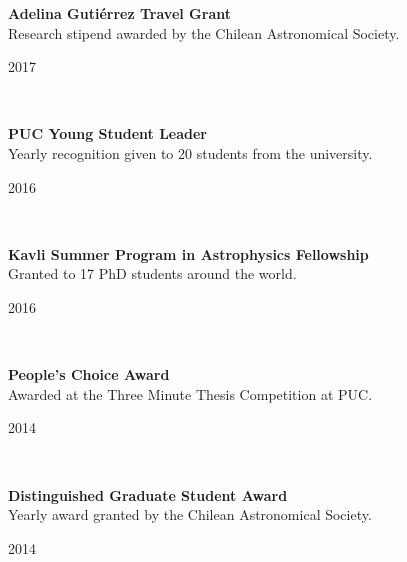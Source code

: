\documentclass[11pt, a4paper]{article} %
\begin{document}
\begin{minipage}[t]{0.7\textwidth}
\begin{flushleft}%
  \setlength{\leftskip}{0.2cm}%
\textbf{Adelina Guti\'errez Travel Grant}\\
Research stipend awarded by the Chilean Astronomical Society.
\end{flushleft}
\end{minipage}
\begin{minipage}[t]{0.3\textwidth}
\hfill 2017
\end{minipage}\\

\begin{minipage}[t]{0.7\textwidth}
\begin{flushleft}%
  \setlength{\leftskip}{0.2cm}%
\textbf{PUC Young Student Leader}\\
Yearly recognition given to 20 students from the university.
\end{flushleft}
\end{minipage}
\begin{minipage}[t]{0.3\textwidth}
\hfill 2016
\end{minipage}\\

\begin{minipage}[t]{0.7\textwidth}
\begin{flushleft}%
  \setlength{\leftskip}{0.2cm}%
\textbf{Kavli Summer Program in Astrophysics Fellowship}\\
Granted to 17 PhD students around the world.
\end{flushleft}
\end{minipage}
\begin{minipage}[t]{0.3\textwidth}
\hfill 2016
\end{minipage}\\

\begin{minipage}[t]{0.7\textwidth}
\begin{flushleft}%
  \setlength{\leftskip}{0.2cm}%
\textbf{People's Choice Award}\\
 Awarded at the Three Minute Thesis\textsuperscript{\textregistered} Competition at PUC.
 \end{flushleft}
\end{minipage}
\begin{minipage}[t]{0.3\textwidth}
\hfill 2014
\end{minipage}\\

\begin{minipage}[t]{0.7\textwidth}
\begin{flushleft}%
  \setlength{\leftskip}{0.2cm}%
\textbf{Distinguished Graduate Student Award}\\
 Yearly award granted by the Chilean Astronomical Society.
 \end{flushleft}
\end{minipage}
\begin{minipage}[t]{0.3\textwidth}
\hfill 2014
\end{minipage}\\
\end{document}
